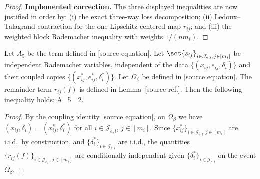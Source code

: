 \documentclass[twoside,11pt]{article}
\makeatletter
\newcommand{\implementedchange}[1]{%
  \par\smallskip\noindent
  {\color{revisionred}\textbf{Implemented correction.} #1}%
  \par\smallskip}
\newcommand{\discardlabel}[1]{}
\newcommand{\discardtwo}[2]{}
\newcommand{\legacyref}[1]{\textup{[source ref.]}}
\newcommand{\legacyeqref}[1]{\textup{[source equation]}}
\newenvironment{legacycomparison}{%
  \begingroup\color{legacygray}%
  \let\label\discardlabel
  \let\originallabel\discardlabel
  \let\ref\legacyref
  \let\pageref\legacyref
  \let\eqref\legacyeqref
  \let\cref\legacyref
  \let\Cref\legacyref
  \let\autoref\legacyref
  \let\aliasref\discardtwo
}{\endgroup}
\newcommand{\aliasref}[2]{%
  \@ifundefined{r@#2}{}{%
    \expandafter\let\csname r@#1\expandafter\endcsname\csname r@#2\endcsname}}
\makeatother
\begin{document}
\begin{legacycomparison}
\begin{proof}
    \implementedchange{The three displayed inequalities are now justified in order by: (i) the exact three-way loss decomposition; (ii) Ledoux--Talagrand contraction for the one-Lipschitz centered map $r_{ij}$; and (iii) the weighted block Rademacher inequality with weights $1/(nm_i)$.}
\end{proof}












\begin{lemma}[Bound of  $A_5$]
\label{lem_a5}
    Let $A_5$ be the term defined in \eqref{def_A5}. Let $\set{s_{ij}}_{i \in \mathcal{J}_{e,l},j\in[m_{i}]}$ be independent Rademacher variables, independent of the data $\{(x_{ij}, e_{ij}, \delta_i)\}$ and their coupled copies $\{(x_{ij}^*, e_{ij}^*, \delta_i^*)\}$. Let $\Omega_\beta$ be defined in \eqref{event_beta}. The remainder term $r_{ij}(f)$ is defined in Lemma~\ref{lem267}. Then the following inequality holds:
\bea
A_5 \,\le\, 2.
    \bea
\end{lemma}

\begin{proof}
By the coupling identity \eqref{eq:Z_equal_on_Omega}, on $\Omega_\beta$ we have $(x_{ij},\delta_i)=(x_{ij}^*,\delta_i^*)$ for all $i\in\mathcal{J}_{e,l}$, $j\in[m_i]$. Since $\{x_{ij}^*\}_{i \in \mathcal{J}_{e,l},j\in[m_{i}]}$ are i.i.d.\ by construction, and $\{\delta_i^*\}_{i \in \mathcal{J}_{e,l}}$ are i.i.d., the quantities $\{r_{ij}(f)\}_{i \in \mathcal{J}_{e,l},j\in[m_{i}]}$ are conditionally independent given $\{\delta_i^*\}_{i \in \mathcal{J}_{e,l}}$ on the event $\Omega_\beta$.


\end{proof}
\end{legacycomparison}
\end{document}
